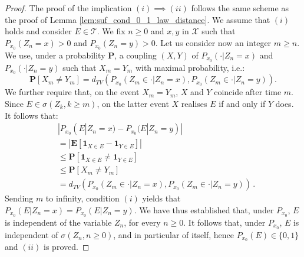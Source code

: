 \documentclass[12pt,a4paper]{article}
\newcommand{\1}[1]{{\mathbf 1}{\{#1\}}}
\newcommand{\8}{{\infty}}
\newcommand{\ind}{{\mathbf{1}}} %
\begin{document}
\begin{proof} The proof of the implication $(i)\implies (ii)$ follows the same scheme as the proof of Lemma \ref{lem:suf_cond_0_1_law_distance}.
  We assume that $(i)$ holds and consider $E\in\mathcal{T}$. 
  We fix $n\ge 0$ and $x,y$ in $\mathcal{X}$ such that $P_{x_0}(Z_n =x)>0$ and $P_{x_0}(Z_n =y)>0$. 
  Let us consider now an integer $m \ge n$. We use, under a probability $\mathbf{P}$, a coupling $(X, Y)$ of $P_{x_0}(\cdot | Z_n =x)$ and $P_{x_0}(\cdot | Z_n =y)$ such that $X_m= Y_m$ with maximal probability, i.e.:
  \begin{equation}
    \mathbf{P}[X_m\neq Y_m]  =  d_{TV}(P_{x_0}(Z_m \in \cdot | Z_n = x), P_{x_0}(Z_m \in \cdot | Z_n = y)).
  \end{equation}
  We further require that, on the event $X_m=Y_m$, $X$ and $Y$ coincide after time $m$. Since $E \in \sigma(Z_k, k\ge m)$, on the latter event $X$ realises $E$ if and only if $Y$ does. It follows that:
  \begin{equation}
    \begin{aligned}
    & |P_{x_0}(E | Z_n = x) - P_{x_0}(E | Z_n = y)| \\
    & = |\mathbf{E}[ \ind_{X \in E} - \ind_{Y \in E} ]| \\
    & \le \mathbf{P}[ \ind_{X \in E} \neq  \ind_{Y \in E} ] \\
    & \le \mathbf{P}[X_m \neq Y_m]\\
    & = d_{TV}(P_{x_0}(Z_m \in \cdot | Z_n = x), P_{x_0}(Z_m \in \cdot | Z_n = y))\, .
    \end{aligned}
  \end{equation}
  Sending $m$ to infinity, condition $(i)$ yields that $P_{x_0}(E | Z_n = x) = P_{x_0}(E | Z_n = y) $. 
  We have thus established that, under $P_{x_0}$, $E$ is independent of the variable $Z_n$, for every $n \ge 0$. It follows that, under $P_{x_0}$, $E$ is independent of $\sigma(Z_n , n\ge 0)$, and in particular of itself, hence $P_{x_0}(E) \in \{0 , 1\}$ and $(ii)$ is proved. 

  \smallskip


\end{proof}
\end{document}

